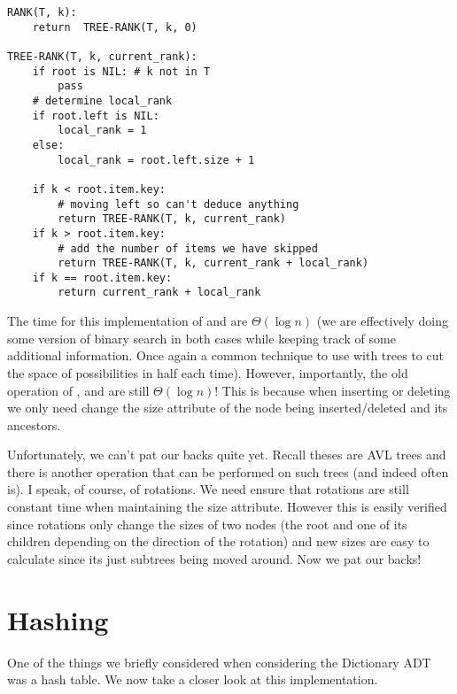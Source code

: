\begin{lstlisting}
RANK(T, k):
    return  TREE-RANK(T, k, 0)
    
TREE-RANK(T, k, current_rank):
    if root is NIL: # k not in T
        pass
    # determine local_rank
    if root.left is NIL:
        local_rank = 1
    else:
        local_rank = root.left.size + 1
    
    if k < root.item.key:
        # moving left so can't deduce anything
        return TREE-RANK(T, k, current_rank)
    if k > root.item.key:
        # add the number of items we have skipped
        return TREE-RANK(T, k, current_rank + local_rank)
    if k == root.item.key:
        return current_rank + local_rank
\end{lstlisting}

The time for this implementation of  and  are $\Theta(\log n)$ (we are effectively doing some version of binary search in both cases while keeping track of some additional information. Once again a common technique to use with trees to cut the space of possibilities in half each time). However, importantly, the old operation of ,  and  are still $\Theta(\log n)$! This is because when inserting or deleting we only need change the size attribute of the node being inserted/deleted and its ancestors.

Unfortunately, we can't pat our backs quite yet. Recall theses are AVL trees and there is another operation that can be performed on such trees (and indeed often is). I speak, of course, of rotations. We need ensure that rotations are still constant time when maintaining the size attribute. However this is easily verified since rotations only change the sizes of two nodes (the root and one of its children depending on the direction of the rotation) and new sizes are easy to calculate since its just subtrees being moved around. Now we pat our backs!

\section{Hashing}\label{sec:hashing}
One of the things we briefly considered when considering the Dictionary ADT was a hash table. We now take a closer look at this implementation.

